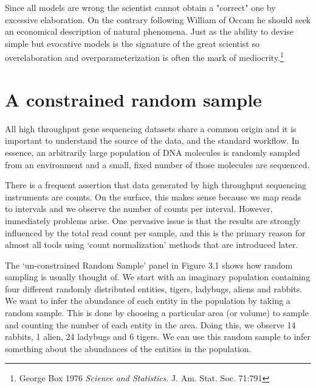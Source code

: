 \documentclass[onecolumn]{book}
\let\rmarkdownfootnote\footnote%
\def\footnote{\protect\rmarkdownfootnote}
\theoremstyle{definition}
\theoremstyle{definition}
\theoremstyle{definition}
\theoremstyle{remark}
\begin{document}
\hspace{2cm}\begin{minipage}[ct]{10cm}
\parskip=5pt
\parindent=5pt

Since all models are wrong the scientist cannot obtain a "correct" one by excessive elaboration. On the contrary following William of Occam he should seek an economical description of natural phenomena. Just as the ability to devise simple but evocative models is the signature of the great scientist so overelaboration and overparameterization is often the mark of mediocrity.\footnote{George Box 1976 \emph{Science and Statistics}. J. Am. Stat. Soc. 71:791}

\end{minipage}

\hypertarget{a-constrained-random-sample}{%
\section{A constrained random
sample}\label{a-constrained-random-sample}}

All high throughput gene sequencing datasets share a common origin and
it is important to understand the source of the data, and the standard
workflow. In essence, an arbitrarily large population of DNA molecules
is randomly sampled from an environment and a small, fixed number of
those molecules are sequenced.

There is a frequent assertion that data generated by high throughput
sequencing instruments are counts. On the surface, this makes sense
because we map reads to intervals and we observe the number of counts
per interval. However, immediately problems arise. One pervasive issue
is that the results are strongly influenced by the total read count per
sample, and this is the primary reason for almost all tools using `count
normalization' methods that are introduced later.

The `un-constrained Random Sample' panel in Figure 3.1 shows how random
sampling is usually thought of. We start with an imaginary population
containing four different randomly distributed entities, tigers,
ladybugs, aliens and rabbits. We want to infer the abundance of each
entity in the population by taking a random sample. This is done by
choosing a particular area (or volume) to sample and counting the number
of each entity in the area. Doing this, we observe 14 rabbits, 1 alien,
24 ladybugs and 6 tigers. We can use this random sample to infer
something about the abundances of the entities in the population.
\end{document}
